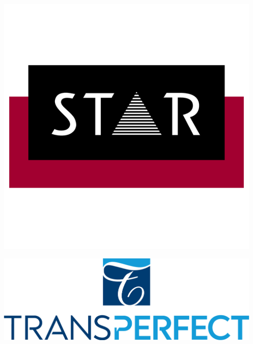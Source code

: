 \documentclass[11pt,oneside]{book}
\begin{document}
\begin{samepage}
\begin{minipage}[c][0.21\linewidth][c]{0.30\linewidth}
      \includegraphics[width=\linewidth]{eamt_volume_1/sponsor_logos/STAR-Signet-rgb.png}
    \end{minipage}\hspace{0.05\linewidth}
    \begin{minipage}[c][0.21\linewidth][c]{0.30\linewidth}
      \includegraphics[width=\linewidth]{eamt_volume_1/sponsor_logos/TP_stacked_logo RGB-01.jpg}
    \end{minipage}\hspace{0.05\linewidth}
          
    \end{samepage}
\end{document}
